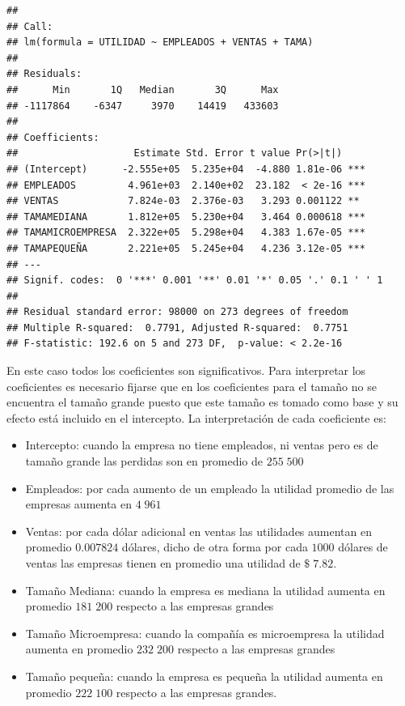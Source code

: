 \documentclass[letterpaper,]{book}
\providecommand{\tightlist}{%
  \setlength{\itemsep}{0pt}\setlength{\parskip}{0pt}}
\begin{document}
\begin{verbatim}
## 
## Call:
## lm(formula = UTILIDAD ~ EMPLEADOS + VENTAS + TAMA)
## 
## Residuals:
##      Min       1Q   Median       3Q      Max 
## -1117864    -6347     3970    14419   433603 
## 
## Coefficients:
##                    Estimate Std. Error t value Pr(>|t|)    
## (Intercept)      -2.555e+05  5.235e+04  -4.880 1.81e-06 ***
## EMPLEADOS         4.961e+03  2.140e+02  23.182  < 2e-16 ***
## VENTAS            7.824e-03  2.376e-03   3.293 0.001122 ** 
## TAMAMEDIANA       1.812e+05  5.230e+04   3.464 0.000618 ***
## TAMAMICROEMPRESA  2.322e+05  5.298e+04   4.383 1.67e-05 ***
## TAMAPEQUEÑA       2.221e+05  5.245e+04   4.236 3.12e-05 ***
## ---
## Signif. codes:  0 '***' 0.001 '**' 0.01 '*' 0.05 '.' 0.1 ' ' 1
## 
## Residual standard error: 98000 on 273 degrees of freedom
## Multiple R-squared:  0.7791, Adjusted R-squared:  0.7751 
## F-statistic: 192.6 on 5 and 273 DF,  p-value: < 2.2e-16
\end{verbatim}

En este caso todos los coeficientes son significativos. Para interpretar los coeficientes es necesario fijarse que en los coeficientes para el tamaño no se encuentra el tamaño grande puesto que este tamaño es tomado como base y su efecto está incluido en el intercepto. La interpretación de cada coeficiente es:

\begin{itemize}
\tightlist
\item
  Intercepto: cuando la empresa no tiene empleados, ni ventas pero es de tamaño grande las perdidas son en promedio de \(255\;500\)
\item
  Empleados: por cada aumento de un empleado la utilidad promedio de las empresas aumenta en \(4\;961\)
\item
  Ventas: por cada dólar adicional en ventas las utilidades aumentan en promedio \(0.007824\) dólares, dicho de otra forma por cada \(1000\) dólares de ventas las empresas tienen en promedio una utilidad de \(\$\;7.82\).
\item
  Tamaño Mediana: cuando la empresa es mediana la utilidad aumenta en promedio \(181\;200\) respecto a las empresas grandes
\item
  Tamaño Microempresa: cuando la compañía es microempresa la utilidad aumenta en promedio \(232\;200\) respecto a las empresas grandes
\item
  Tamaño pequeña: cuando la empresa es pequeña la utilidad aumenta en promedio \(222\;100\) respecto a las empresas grandes.
\end{itemize}
\end{document}
